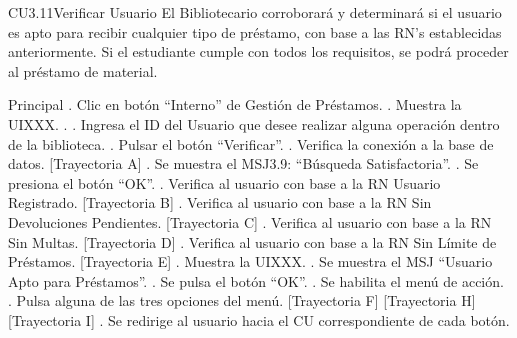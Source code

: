 
	\begin{UseCase}{CU3.11}{Verificar Usuario}{
		El Bibliotecario corroborará y determinará si el usuario es apto para recibir cualquier tipo de préstamo, con base a las RN’s establecidas anteriormente. Si el estudiante cumple con todos los requisitos, se podrá proceder al préstamo de material.
	}
	\end{UseCase}
	\begin{UCtrayectoria}{Principal}
		.	Clic en botón “Interno” de Gestión de Préstamos.
		.	Muestra la UIXXX. .
		.	Ingresa el ID del Usuario que desee realizar alguna operación dentro de la biblioteca.
		.	Pulsar el botón “Verificar”. 
		.	Verifica la conexión a la base de datos. [Trayectoria A] 
		.	Se muestra el MSJ3.9: “Búsqueda Satisfactoria”.
		.	Se presiona el botón “OK”.
		.	Verifica al usuario con base a la RN Usuario Registrado. [Trayectoria B]
		.	Verifica al usuario con base a la RN Sin Devoluciones Pendientes. [Trayectoria C]
		.	Verifica al usuario con base a la RN Sin Multas. [Trayectoria D]
		.	Verifica al usuario con base a la RN Sin Límite de Préstamos. [Trayectoria E]
		.	Muestra la UIXXX.
		.	Se muestra el MSJ “Usuario Apto para Préstamos”.
		. Se pulsa el botón “OK”. 
		. Se habilita el menú de acción.
		. Pulsa alguna de las tres opciones del menú. [Trayectoria F] [Trayectoria H] [Trayectoria I]
		. Se redirige al usuario hacia el CU correspondiente de cada botón.
 
	\end{UCtrayectoria}



